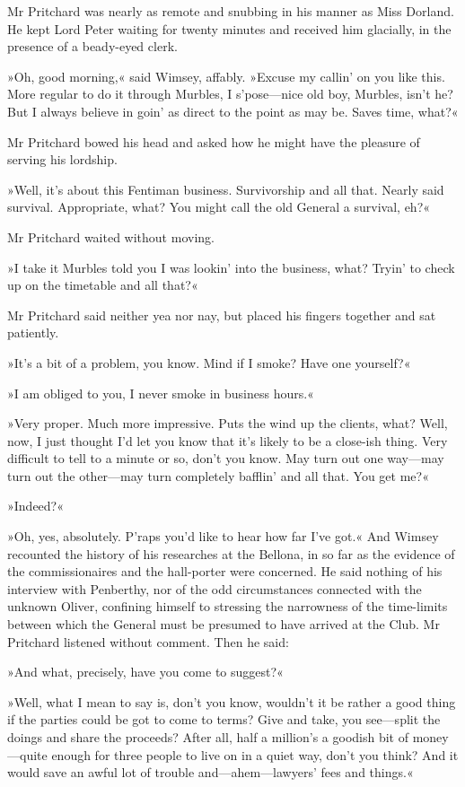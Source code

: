 Mr Pritchard was nearly as remote and snubbing in his manner as Miss Dorland. He kept Lord Peter waiting for twenty minutes and received him glacially, in the presence of a beady-eyed clerk.

»Oh, good morning,« said Wimsey, affably. »Excuse my callin' on you like this. More regular to do it through Murbles, I s'pose—nice old boy, Murbles, isn't he? But I always believe in goin' as direct to the point as may be. Saves time, what?«

Mr Pritchard bowed his head and asked how he might have the pleasure of serving his lordship.

»Well, it's about this Fentiman business. Survivorship and all that. Nearly said survival. Appropriate, what? You might call the old General a survival, eh?«

Mr Pritchard waited without moving.

»I take it Murbles told you I was lookin' into the business, what? Tryin' to check up on the timetable and all that?«

Mr Pritchard said neither yea nor nay, but placed his fingers together and sat patiently.

»It's a bit of a problem, you know. Mind if I smoke? Have one yourself?«

»I am obliged to you, I never smoke in business hours.«

»Very proper. Much more impressive. Puts the wind up the clients, what? Well, now, I just thought I'd let you know that it's likely to be a close-ish thing. Very difficult to tell to a minute or so, don't you know. May turn out one way—may turn out the other—may turn completely bafflin' and all that. You get me?«

»Indeed?«

»Oh, yes, absolutely. P'raps you'd like to hear how far I've got.« And Wimsey recounted the history of his researches at the Bellona, in so far as the evidence of the commissionaires and the hall-porter were concerned. He said nothing of his interview with Penberthy, nor of the odd circumstances connected with the unknown Oliver, confining himself to stressing the narrowness of the time-limits between which the General must be presumed to have arrived at the Club. Mr Pritchard listened without comment. Then he said:

»And what, precisely, have you come to suggest?«

»Well, what I mean to say is, don't you know, wouldn't it be rather a good thing if the parties could be got to come to terms? Give and take, you see—split the doings and share the proceeds? After all, half a million's a goodish bit of money—quite enough for three people to live on in a quiet way, don't you think? And it would save an awful lot of trouble and—ahem—lawyers' fees and things.«

